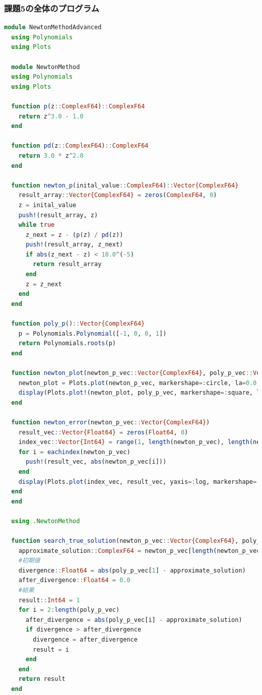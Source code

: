\documentclass[uplatex, dvipdfmx, a4j,11pt]{jsarticle}
\begin{document}
\subsubsection*{課題5の全体のプログラム}
\begin{lstlisting}[title={課題5の全体のプログラム}, label=code:in, language=Julia]
module NewtonMethodAdvanced
  using Polynomials
  using Plots
  
  module NewtonMethod
  using Polynomials
  using Plots
  
  function p(z::ComplexF64)::ComplexF64
    return z^3.0 - 1.0
  end
  
  function pd(z::ComplexF64)::ComplexF64
    return 3.0 * z^2.0
  end
  
  function newton_p(inital_value::ComplexF64)::Vector{ComplexF64}
    result_array::Vector{ComplexF64} = zeros(ComplexF64, 0)
    z = inital_value
    push!(result_array, z)
    while true
      z_next = z - (p(z) / pd(z))
      push!(result_array, z_next)
      if abs(z_next - z) < 10.0^(-5)
        return result_array
      end
      z = z_next
    end
  end
  
  function poly_p()::Vector{ComplexF64}
    p = Polynomials.Polynomial([-1, 0, 0, 1])
    return Polynomials.roots(p)
  end
  
  function newton_plot(newton_p_vec::Vector{ComplexF64}, poly_p_vec::Vector{ComplexF64})
    newton_plot = Plots.plot(newton_p_vec, markershape=:circle, la=0.0, label="Newton Method")
    display(Plots.plot!(newton_plot, poly_p_vec, markershape=:square, la=0.0, label="Answer"))
  end
  
  function newton_error(newton_p_vec::Vector{ComplexF64})
    result_vec::Vector{Float64} = zeros(Float64, 0)
    index_vec::Vector{Int64} = range(1, length(newton_p_vec), length(newton_p_vec))
    for i = eachindex(newton_p_vec)
      push!(result_vec, abs(newton_p_vec[i]))
    end
    display(Plots.plot(index_vec, result_vec, yaxis=:log, markershape=:square, la=0.0, label="Error by Newton Method"))
  end
  end
  
  using .NewtonMethod
  
  function search_true_solution(newton_p_vec::Vector{ComplexF64}, poly_p_vec::Vector{ComplexF64})::Int64
    approximate_solution::ComplexF64 = newton_p_vec[length(newton_p_vec)]
    #初期値
    divergence::Float64 = abs(poly_p_vec[1] - approximate_solution)
    after_divergence::Float64 = 0.0
    #結果
    result::Int64 = 1
    for i = 2:length(poly_p_vec)
      after_divergence = abs(poly_p_vec[i] - approximate_solution)
      if divergence > after_divergence
        divergence = after_divergence
        result = i
      end
    end
    return result
  end
  

\end{lstlisting}
\end{document}
